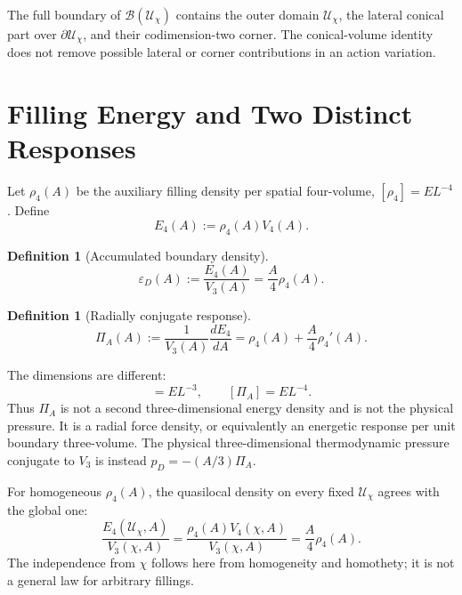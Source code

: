 \documentclass[11pt,a4paper]{article}
\def\dd{d}%
\numberwithin{equation}{section}
\newtheorem{definition}[criterion]{Definition}
\theoremstyle{remark}
\newcommand{\Dom}{\mathcal{U}}
\newcommand{\B}{\mathcal{B}}
\newcommand{\Efour}{E_4}
\newcommand{\rhoFour}{\rho_4}
\newcommand{\epsD}{\varepsilon_D}
\newcommand{\pD}{p_D}
\newcommand{\PiA}{\Pi_A}
\newcommand{\dd}{\mathrm{d}}
\begin{document}
The full boundary of \(\B(\Dom_\chi)\) contains the outer domain \(\Dom_\chi\), the lateral conical part over \(\partial\Dom_\chi\), and their codimension-two corner. The conical-volume identity does not remove possible lateral or corner contributions in an action variation.

\section{Filling Energy and Two Distinct Responses}
Let \(\rhoFour(A)\) be the auxiliary filling density per spatial four-volume, \([\rhoFour]=EL^{-4}\). Define
\begin{equation}
\Efour(A):=\rhoFour(A)V_4(A).
\end{equation}

\begin{definition}[Accumulated boundary density]
\begin{equation}
\epsD(A):=\frac{\Efour(A)}{V_3(A)}=\frac{A}{4}\rhoFour(A).
\end{equation}
\end{definition}

\begin{definition}[Radially conjugate response]
\begin{equation}
\PiA(A):=\frac{1}{V_3(A)}\frac{\dd\Efour}{\dd A}
=\rhoFour(A)+\frac{A}{4}\rhoFour'(A).
\end{equation}
\end{definition}

The dimensions are different:
\begin{equation}
[\epsD]=EL^{-3},
\qquad
[\PiA]=EL^{-4}.
\end{equation}
Thus \(\PiA\) is not a second three-dimensional energy density and is not the physical pressure. It is a radial force density, or equivalently an energetic response per unit boundary three-volume. The physical three-dimensional thermodynamic pressure conjugate to \(V_3\) is instead \(\pD=-(A/3)\PiA\).

For homogeneous \(\rhoFour(A)\), the quasilocal density on every fixed \(\Dom_\chi\) agrees with the global one:
\begin{equation}
\frac{\Efour(\Dom_\chi,A)}{V_3(\chi,A)}
=\frac{\rhoFour(A)V_4(\chi,A)}{V_3(\chi,A)}
=\frac{A}{4}\rhoFour(A).
\end{equation}
The independence from \(\chi\) follows here from homogeneity and homothety; it is not a general law for arbitrary fillings.
\end{document}
